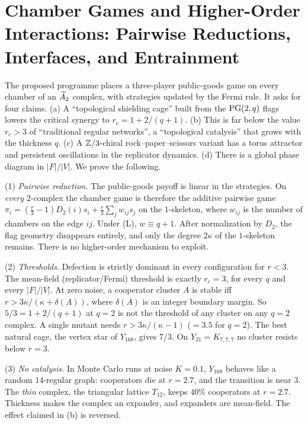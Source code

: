 ﻿%
\chapter{Chamber Games and Higher-Order Interactions: Pairwise Reductions, Interfaces, and Entrainment}\label{chap:V3P5}
\begin{chapterabstract}
The proposed programme places a three-player public-goods game on every chamber of an $\widetilde A_2$
complex, with strategies updated by the Fermi rule. It asks for four claims. (a) A ``topological
shielding cage'' built from the $\mathrm{PG}(2,q)$ flags lowers the critical synergy to
$r_c=1+2/(q+1)$. (b) This is far below the value $r_c>3$ of ``traditional regular networks'',
a ``topological catalysis'' that grows with the thickness $q$. (c) A $\mathbb{Z}/3$-chiral
rock--paper--scissors variant has a torus attractor and persistent oscillations in the
replicator dynamics. (d) There is a global phase diagram in $|F|/|V|$. We prove the
following.

(1) \emph{Pairwise reduction.} The public-goods payoff is linear in the strategies. On
\emph{every} $2$-complex the chamber game is therefore the additive pairwise game
$\pi_i=(\frac r3-1)D_2(i)s_i+\frac r3\sum_jw_{ij}s_j$ on the $1$-skeleton, where $w_{ij}$ is
the number of chambers on the edge $ij$. Under (L), $w\equiv q+1$. After normalization by
$D_2$, the flag geometry disappears entirely, and only the degree $2\kappa$ of the
$1$-skeleton remains. There is no higher-order mechanism to exploit.

(2) \emph{Thresholds.} Defection is strictly dominant in every configuration for $r<3$. The
mean-field (replicator/Fermi) threshold is exactly $r_c=3$, for every $q$ and every $|F|/|V|$.
At zero noise, a cooperator cluster $A$ is stable iff $r>3\kappa/(\kappa+\delta(A))$, where
$\delta(A)$ is an integer boundary margin. So $5/3=1+2/(q+1)$ at $q=2$ is not the threshold of
any cluster on any $q=2$ complex. A single mutant needs $r>3\kappa/(\kappa-1)$ ($=3.5$ for
$q=2$). The best natural cage, the vertex star of $Y_{168}$, gives $7/3$. On $Y_{21}=K_{7,7,7}$
no cluster resists below $r=3$.

(3) \emph{No catalysis.} In Monte Carlo runs at noise $K=0.1$, $Y_{168}$ behaves like a random
$14$-regular graph: cooperators die at $r=2.7$, and the transition is near $3$. The
\emph{thin} complex, the triangular lattice $T_{12}$, keeps $40\%$ cooperators at $r=2.7$.
Thickness makes the complex an expander, and expanders are mean-field. The effect claimed in
(b) is reversed.


\end{chapterabstract}
